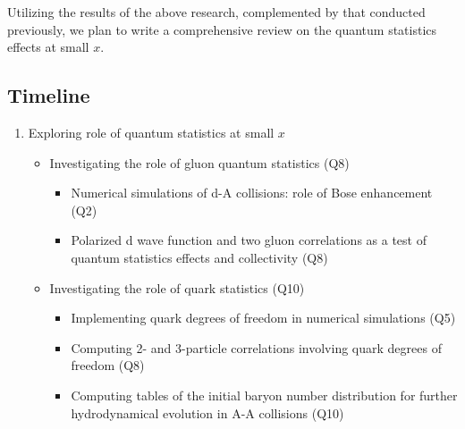 		
		Utilizing  the results of the above research, complemented by that conducted previously, 
		we plan to write a comprehensive review on the quantum statistics effects at small $x$. 


    \vspace{0.5em}
    \subsection{Timeline}
        \label{sec:p32}
        \begin{enumerate}
            \item Exploring role of quantum statistics at small $x$
                \begin{itemize}
                    \item Investigating the role of gluon quantum statistics (Q8)
                        \begin{itemize}
                            \item Numerical simulations of d-A collisions: role of Bose enhancement (Q2) 
                            \item Polarized d wave function and two gluon correlations as a test of quantum 
								statistics effects and collectivity (Q8) 
                        \end{itemize}
                    \item Investigating the role of quark statistics (Q10)
                        \begin{itemize}
                            \item Implementing quark degrees of freedom in numerical simulations (Q5)
                            \item Computing 2- and 3-particle correlations involving quark degrees of freedom (Q8)
                            \item Computing tables of the initial baryon number distribution for further hydrodynamical evolution in A-A collisions   (Q10)
                        \end{itemize}
                \end{itemize}
        \end{enumerate}


